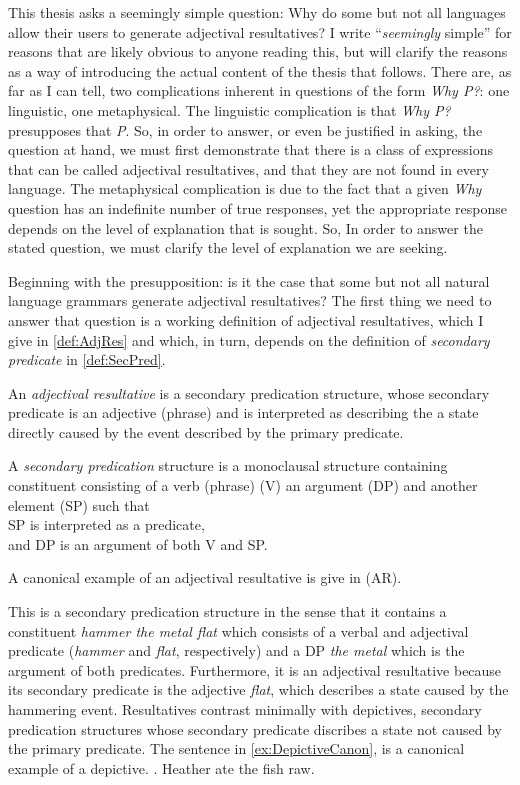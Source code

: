 \documentclass[MilwayThesis]{subfiles}
\begin{document}
This thesis asks a seemingly simple question: Why do some but not all languages allow their users to generate adjectival resultatives?
I write ``\textit{seemingly} simple'' for reasons that are likely obvious to anyone reading this, but will clarify the reasons as a way of introducing the actual content of the thesis that follows.
There are, as far as I can tell, two complications inherent in questions of the form \textit{Why P?}: one linguistic, one metaphysical.
The linguistic complication is that \textit{Why P?} presupposes that \textit{P}.
So, in order to answer, or even be justified in asking, the question at hand, we must first demonstrate that there is a class of expressions that can be called adjectival resultatives, and that they are not found in every language.
The metaphysical complication is due to the fact that a given \textit{Why} question has an indefinite number of true responses, yet the appropriate response depends on the level of explanation that is sought.
So, In order to answer the stated question, we must clarify the level of explanation we are seeking.

Beginning with the presupposition: is it the case that some but not all natural language grammars generate adjectival resultatives?
The first thing we need to answer that question is a working definition of adjectival resultatives, which I give in \cref{def:AdjRes} and which, in turn, depends on the definition of \textit{secondary predicate} in \cref{def:SecPred}.
\begin{defn}\label{def:AdjRes}
	An \textit{adjectival resultative} is a secondary predication structure, whose secondary predicate is an adjective (phrase) and is interpreted as describing the a state directly caused by the event described by the primary predicate.
\end{defn}
\begin{defn}\label{def:SecPred}
	A \textit{secondary predication} structure is a monoclausal structure containing constituent consisting of a verb (phrase) (V) an argument (DP) and another element (SP) such that\\
	SP is interpreted as a predicate,\\
	and DP is an argument of both V and SP.
\end{defn}

A canonical example of an adjectival resultative is give in (AR).
\AREx

This is a secondary predication structure in the sense that it contains a constituent \textit{hammer the metal flat} which consists of a verbal and adjectival predicate (\textit{hammer} and \textit{flat}, respectively) and a DP \textit{the metal} which is the argument of both predicates.
Furthermore, it is an adjectival resultative because its secondary predicate is the adjective \textit{flat}, which describes a state caused by the hammering event.
Resultatives contrast minimally with depictives, secondary predication structures whose secondary predicate discribes a state not caused by the primary predicate.
The sentence in \cref{ex:DepictiveCanon}, is a canonical example of a depictive.
\ex.\label{ex:DepictiveCanon} Heather ate the fish raw.
\end{document}
